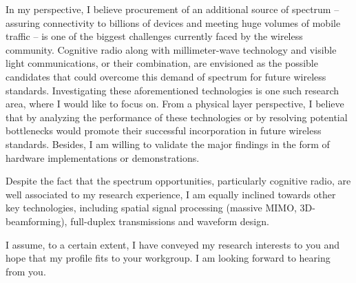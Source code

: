\documentclass[11pt,a4paper,sans]{moderncv}        %
\begin{document}
In my perspective, I believe procurement of an additional source of spectrum -- assuring connectivity to billions of devices and meeting huge volumes of mobile traffic -- is one of the biggest challenges currently faced by the wireless community. Cognitive radio along with millimeter-wave technology and visible light communications, or their combination, are envisioned as the possible candidates that could overcome this demand of spectrum for future wireless standards. Investigating these aforementioned technologies is one such research area, where I would like to focus on. From a physical layer perspective, I believe that by analyzing the performance of these technologies or by resolving potential bottlenecks would promote their successful incorporation in future wireless standards. Besides, I am willing to validate the major findings in the form of hardware implementations or demonstrations. %

Despite the fact that the spectrum opportunities, particularly cognitive radio, are well associated to my research experience, I am equally inclined towards other key technologies, including spatial signal processing (massive MIMO, 3D-beamforming), full-duplex transmissions and waveform design. 

I assume, to a certain extent, I have conveyed my research interests to you and hope that my profile fits to your workgroup. I am looking forward to hearing from you. 


\makeletterclosing
\end{document}
